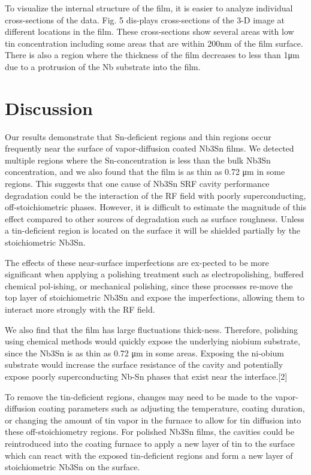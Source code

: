 To visualize the internal structure of the film, it is easier to analyze individual cross-sections of the data. Fig. 5 dis-plays cross-sections of the 3-D image at different locations in the film. These cross-sections show several areas with low tin concentration including some areas that are within 200nm of the film surface. There is also a region where the thickness of the film decreases to less than 1μm due to a protrusion of the Nb substrate into the film.

 
\section{Discussion}

Our results demonstrate that Sn-deficient regions and thin regions occur frequently near the surface of vapor-diffusion coated Nb3Sn films. We detected multiple regions where the Sn-concentration is less than the bulk Nb3Sn concentration, and we also found that the film is as thin as 0.72 μm in some regions. This suggests that one cause of Nb3Sn SRF cavity performance degradation could be the interaction of the RF field with poorly superconducting, off-stoichiometric phases. However, it is difficult to estimate the magnitude of this effect compared to other sources of degradation such as surface roughness. Unless a tin-deficient region is located on the surface it will be shielded partially by the stoichiometric Nb3Sn. 

The effects of these near-surface imperfections are ex-pected to be more significant when applying a polishing treatment such as electropolishing, buffered chemical pol-ishing, or mechanical polishing, since these processes re-move the top layer of stoichiometric Nb3Sn and expose the imperfections, allowing them to interact more strongly with the RF field. 

We also find that the film has large fluctuations thick-ness. Therefore, polishing using chemical methods would quickly expose the underlying niobium substrate, since the Nb3Sn is as thin as 0.72 μm in some areas. Exposing the ni-obium substrate would increase the surface resistance of the cavity and potentially expose poorly superconducting Nb-Sn phases that exist near the interface.[2]

To remove the tin-deficient regions, changes may need to be made to the vapor-diffusion coating parameters such as adjusting the temperature, coating duration, or changing the amount of tin vapor in the furnace to allow for tin diffusion into these off-stoichiometry regions. For polished Nb3Sn films, the cavities could be reintroduced into the coating furnace to apply a new layer of tin to the surface which can react with the exposed tin-deficient regions and form a new layer of stoichiometric Nb3Sn on the surface.


